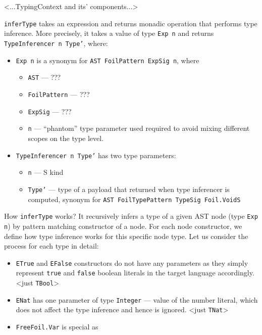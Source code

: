 \section{}

<...TypingContext and its' components...>

\texttt{inferType} takes an expression and returns monadic operation that performs type inference. More precisely, it takes a value of type \texttt{Exp n} and returns \texttt{TypeInferencer n Type'}, where:

\begin{itemize}
  \item \texttt{Exp n} is a synonym for \texttt{AST FoilPattern ExpSig n}, where
  \begin{itemize}
    \item \texttt{AST} — ???
    \item \texttt{FoilPattern} — ???
    \item \texttt{ExpSig} — ???
    \item \texttt{n} — ``phantom'' type parameter used required to avoid mixing different scopes on the type level.
  \end{itemize}
  \item \texttt{TypeInferencer n Type'} has two type parameters:
  \begin{itemize}
    \item \texttt{n} — S kind
    \item \texttt{Type'} — type of a payload that returned when type inferencer is computed, synonym for \texttt{AST FoilTypePattern TypeSig Foil.VoidS}
  \end{itemize}
\end{itemize}

How \texttt{inferType} works? It recursively infers a type of a given AST node (type \texttt{Exp n}) by pattern matching constructor of a node. For each node constructor, we define how type inference works for this specific node type. Let us consider the process for each type in detail:

\begin{itemize}
  \item \texttt{ETrue} and \texttt{EFalse} constructors do not have any parameters as they simply represent \texttt{true} and \texttt{false} boolean literals in the target language accordingly. \textless just \texttt{TBool}\textgreater
  \item \texttt{ENat} has one parameter of type \texttt{Integer} — value of the number literal, which does not affect the type inference and hence is ignored. \textless just \texttt{TNat}\textgreater
  \item \texttt{FreeFoil.Var} is special as
\end{itemize}

